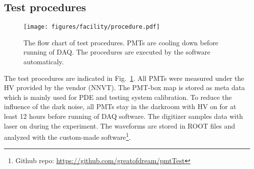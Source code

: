 \subsection{Test procedures}
\begin{figure}
    \centering
    \texttt{[image: figures/facility/procedure.pdf]}
    \caption{The flow chart of test procedures. PMTs are cooling down before running of DAQ. The procedures are executed by the software automaticaly.}
    \label{fig:testingprocedure}
\end{figure}

The test procedures are indicated in Fig.~\ref{fig:testingprocedure}. All PMTs were measured under the HV provided by the vendor (NNVT). The PMT-box map is stored as meta data which is mainly used for PDE and testing system calibration. To reduce the influence of the dark noise, all PMTs stay in the darkroom with HV on for at least 12 hours before running of DAQ software. The digitizer samples data with laser on during the experiment. The waveforms are stored in ROOT files and analyzed with the custom-made software\footnote{Github repo: \url{https://github.com/greatofdream/pmtTest}}.
